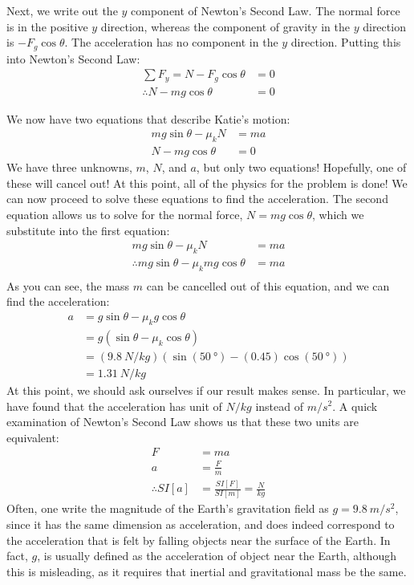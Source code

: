 \begin{problem}
Next, we write out the $y$ component of Newton's Second Law. The normal force is in the positive $y$ direction, whereas the component of gravity in the $y$ direction is $-F_g\cos\theta$. The acceleration has no component in the $y$ direction. Putting this into Newton's Second Law:
\begin{align*}
\sum F_y = N-F_g\cos\theta &=0\\
\therefore N-mg\cos\theta &=0
\end{align*}

We now have two equations that describe Katie's motion:
\begin{align*}
mg\sin\theta -\mu_k N &= ma\\
N-mg\cos\theta &=0
\end{align*}
We have three unknowns, $m$, $N$, and $a$, but only two equations! Hopefully, one of these will cancel out! At this point, all of the physics for the problem is done! We can now proceed to solve these equations to find the acceleration. The second equation allows us to solve for the normal force, $N=mg\cos\theta$, which we substitute into the first equation:
\begin{align*}
mg\sin\theta -\mu_k N &= ma\\
\therefore mg\sin\theta -\mu_k mg\cos\theta &= ma\\
\end{align*}
As you can see, the mass $m$ can be cancelled out of this equation, and we can find the acceleration:
\begin{align*}
a&=g\sin\theta -\mu_k g\cos\theta\\
&=g(\sin\theta-\mu_k\cos\theta)\\
&=(\SI{9.8}{N/kg})\left(\sin(\SI{50}{\degree})-(0.45)\cos(\SI{50}{\degree})\right)\\
&=\SI{1.31}{N/kg} %
\end{align*}
At this point, we should ask ourselves if our result makes sense. In particular, we have found that the acceleration has unit of $\si{N/kg}$ instead of $\si{m/s^2}$. A quick examination of Newton's Second Law shows us that these two units are equivalent:
\begin{align*}
F &= ma\\
a &= \frac{F}{m}\\
\therefore SI[a] &= \frac{SI[F]}{SI[m]}=\frac{\si{N}}{\si{kg}}
\end{align*}
Often, one write the magnitude of the Earth's gravitation field as $g=\SI{9.8}{m/s^2}$, since it has the same dimension as acceleration, and does indeed correspond to the acceleration that is felt by falling objects near the surface of the Earth. In fact, $g$, is usually defined as the acceleration of object near the Earth, although this is misleading, as it requires that inertial and gravitational mass be the same. 



\end{problem}
